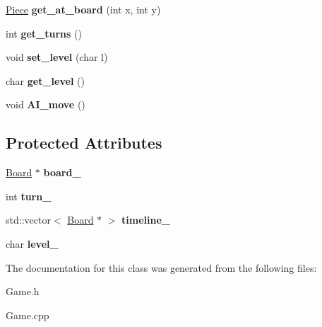 \begin{DoxyCompactItemize}
\hyperlink{class_piece}{Piece} {\bfseries get\+\_\+at\+\_\+board} (int x, int y)
\item 
\mbox{\label{class_game_a65250bbb867f1eb8067dab620a1dfd58}} 
int {\bfseries get\+\_\+turns} ()
\item 
\mbox{\label{class_game_aed72a88415e4978d27c72e6929264e0d}} 
void {\bfseries set\+\_\+level} (char l)
\item 
\mbox{\label{class_game_a0643486d59cd27c1089d97ecffec1c79}} 
char {\bfseries get\+\_\+level} ()
\item 
\mbox{\label{class_game_ac495c211545773a11948a3b3ac52bb18}} 
void {\bfseries A\+I\+\_\+move} ()
\end{DoxyCompactItemize}
\subsection*{Protected Attributes}
\begin{DoxyCompactItemize}
\item 
\mbox{\label{class_game_ade066636bda0bcc3501deb4981d9f400}} 
\hyperlink{class_board}{Board} $\ast$ {\bfseries board\+\_\+}
\item 
\mbox{\label{class_game_abc9f7b7f1ced3ddb136dbd25bebd4e2a}} 
int {\bfseries turn\+\_\+}
\item 
\mbox{\label{class_game_aacf1e01c0a9777117e730c8105fc339c}} 
std\+::vector$<$ \hyperlink{class_board}{Board} $\ast$ $>$ {\bfseries timeline\+\_\+}
\item 
\mbox{\label{class_game_a9fcfb58bda101e497f8845f01ba56582}} 
char {\bfseries level\+\_\+}
\end{DoxyCompactItemize}


The documentation for this class was generated from the following files\+:\begin{DoxyCompactItemize}
\item 
Game.\+h\item 
Game.\+cpp\end{DoxyCompactItemize}
